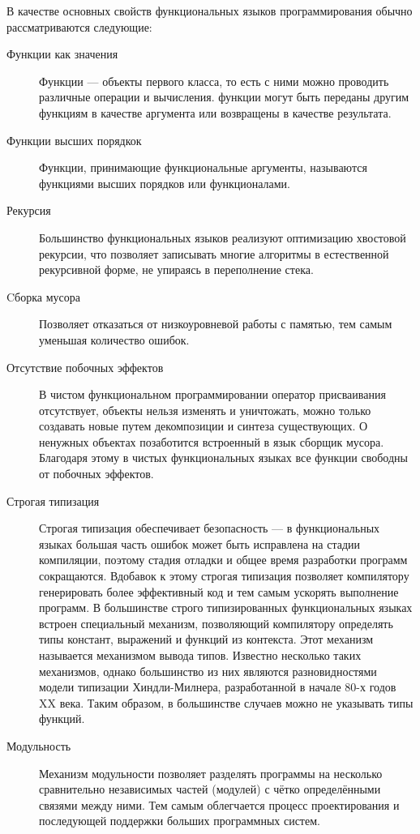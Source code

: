 В качестве основных свойств функциональных языков программирования
обычно рассматриваются следующие:
\begin{description}
\item[Функции как значения] Функции --- объекты первого класса, то
  есть с ними можно проводить различные операции и вычисления. функции
  могут быть переданы другим функциям в качестве аргумента или
  возвращены в качестве результата.
\item[Функции высших порядкок] Функции, принимающие
  функциональные аргументы, называются функциями высших порядков или
  функционалами.
\item[Рекурсия] Большинство функциональных языков реализуют оптимизацию
  хвостовой рекурсии, что позволяет записывать многие алгоритмы в
  естественной рекурсивной форме, не упираясь в переполнение стека.
\item[Cборка мусора] Позволяет отказаться от низкоуровневой работы с
  памятью, тем самым уменьшая количество ошибок.
\item[Отсутствие побочных эффектов] В чистом функциональном
  программировании оператор присваивания отсутствует, объекты нельзя
  изменять и уничтожать, можно только создавать новые путем
  декомпозиции и синтеза существующих. О ненужных объектах позаботится
  встроенный в язык сборщик мусора. Благодаря этому в чистых
  функциональных языках все функции свободны от побочных эффектов.
\item[Строгая типизация] Строгая типизация обеспечивает безопасность
  --- в функциональных языках большая часть ошибок может быть
  исправлена на стадии компиляции, поэтому стадия отладки и общее
  время разработки программ сокращаются. Вдобавок к этому строгая
  типизация позволяет компилятору генерировать более эффективный код и
  тем самым ускорять выполнение программ. В большинстве строго типизированных
  функциональных языках встроен специальный механизм, позволяющий
  компилятору определять типы констант, выражений и функций из
  контекста. Этот механизм называется механизмом вывода типов.
  Известно несколько таких механизмов, однако большинство из них
  являются разновидностями модели типизации Хиндли-Милнера,
  разработанной в начале 80-х годов XX века. Таким образом, в
  большинстве случаев можно не указывать типы функций.
\item[Модульность] Механизм модульности позволяет разделять программы
  на несколько сравнительно независимых частей (модулей) с чётко
  определёнными связями между ними. Тем самым облегчается процесс
  проектирования и последующей поддержки больших программных систем.

\end{description}

